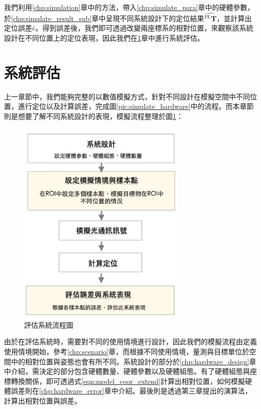 我們利用\ref{chp:simulation}章中的方法，帶入\ref{chp:simulate_para}章中的硬體參數，於\ref{chp:simulate_result_sub}章中呈現不同系統設計下的定位結果$\hat{^{PL}\boldsymbol{T}}$，並計算出定位誤差$\hat{e}$。得到誤差後，我們即可透過改變兩座標系的相對位置，來觀察該系統設計在不同位置上的定位表現，因此我們在\ref{chp:system_evaluate}章中進行系統評估。






\section{系統評估}
\label{chp:system_evaluate}

上一章節中，我們能夠完整的以數值模擬方式，針對不同設計在模擬空間中不同位置，進行定位以及計算誤差，完成圖\ref{pic:simulate_hardware}中的流程。而本章節則是想要了解不同系統設計的表現，模擬流程整理於圖\ref{pic:evaluate_flow}：


\begin{figure}[ht]
    \centering
    \includegraphics[width=8cm]{ch4pic/evaluate_flow.png}
    \caption{評估系統流程圖}
    \label{pic:evaluate_flow}
\end{figure}

由於在評估系統時，需要對不同的使用情境進行設計，因此我們的模擬流程由定義使用情境開始，參考\ref{chp:scenario}章，而根據不同使用情境，量測與目標單位於空間中的相對位置與姿態也會有所不同。系統設計的部分於\ref{chp:hardware_design}章中介紹，需決定的部分包含硬體數量、硬體參數以及硬體組態。有了硬體組態與座標轉換關係，即可透過式\ref{eqn:model_coor_extend}計算出相對位置，如何模擬硬體誤差則在\ref{chp:hardware_error}章中介紹。最後則是透過第三章提出的演算法，計算出相對位置與誤差。

